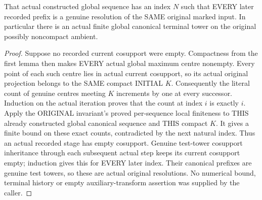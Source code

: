 \begin{theorem}
\label{hir:original-compact-cosupport-actual-global-eventual-resolution}
\leanok
That actual constructed global sequence has an index $N$ such that EVERY
later recorded prefix is a genuine resolution of the SAME original marked
input. In particular there is an actual finite global canonical terminal
tower on the original possibly noncompact ambient.
\end{theorem}
\begin{proof}
Suppose no recorded current cosupport were empty. Compactness from the first
lemma then makes EVERY actual global maximum centre nonempty. Every point
of each such centre lies in actual current cosupport, so its actual original
projection belongs to the SAME compact INITIAL $K$. Consequently the literal
count of genuine centres meeting $K$ increments by one at every successor.
Induction on the actual iteration proves that the count at index $i$ is
exactly $i$. Apply the ORIGINAL invariant's proved per-sequence local
finiteness to THIS already constructed global canonical sequence and THIS
compact $K$. It gives a finite bound on these exact counts, contradicted by
the next natural index. Thus an actual recorded stage has empty cosupport.
Genuine test-tower cosupport inheritance through each subsequent actual
step keeps its current cosupport empty; induction gives this for EVERY
later index. Their canonical prefixes are genuine test towers, so these are
actual original resolutions. No numerical bound, terminal history or empty
auxiliary-transform assertion was supplied by the caller.
\end{proof}


